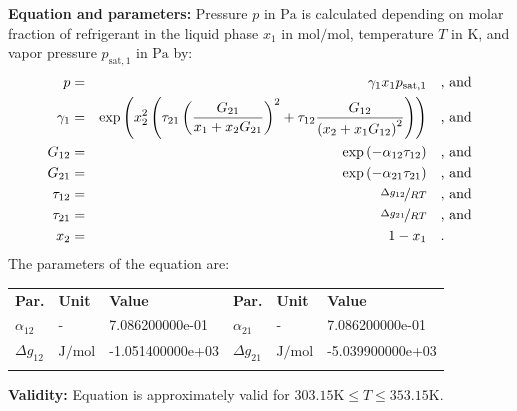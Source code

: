 \textbf{Equation and parameters:}
\newline
%
Pressure $p$ in $\si{\pascal}$ is calculated depending on molar fraction of refrigerant in the liquid phase $x_1$ in $\si{\mole\per\mole}$, temperature $T$ in $\si{\kelvin}$, and vapor pressure $p_\mathrm{sat,1}$ in $\si{\pascal}$ by:
%
\begin{equation*}
\begin{split}
p &=& \gamma_1 x_1 p_\mathrm{sat,1} & \quad\text{, and} \\
\gamma_1 &=& \exp \left( x_2^2 \left( \tau_{21} \left( \frac{G_{21}}{x_1 + x_2 G_{21}} \right) ^2 + \tau_{12} \frac{G_{12}}{\left( x_2 + x_1 G_{12} \right) ^2}\right) \right) & \quad\text{, and} \\
G_{12} &=& \exp \left( -\alpha_{12} \tau_{12} \right) & \quad\text{, and} \\
G_{21} &=& \exp \left( -\alpha_{21} \tau_{21} \right) & \quad\text{, and} \\
\tau_{12} &=& \nicefrac{\Delta g_{12}}{R T} & \quad\text{, and} \\
\tau_{21} &=& \nicefrac{\Delta g_{21}}{R T} & \quad\text{, and} \\
x_2 &=& 1 - x_1  & \quad\text{.} \\
\end{split}
\end{equation*}
%
The parameters of the equation are:
%
\begin{longtable}[l]{lll|lll}
\toprule
\addlinespace
\textbf{Par.} & \textbf{Unit} & \textbf{Value} &	\textbf{Par.} & \textbf{Unit} & \textbf{Value} \\
\addlinespace
\midrule
\endhead

\bottomrule
\endfoot
\bottomrule
\endlastfoot
\addlinespace

$\alpha_{12}$ & - & 7.086200000e-01 & $\alpha_{21}$ & - & 7.086200000e-01 \\
$\Delta g_{12}$ & $\si{\joule\per\mole}$ & -1.051400000e+03 & $\Delta g_{21}$ & $\si{\joule\per\mole}$ & -5.039900000e+03 \\

\addlinespace\end{longtable}

\textbf{Validity:}
\newline
Equation is approximately valid for $303.15 \si{\kelvin} \leq T \leq 353.15 \si{\kelvin}$.
\newline

